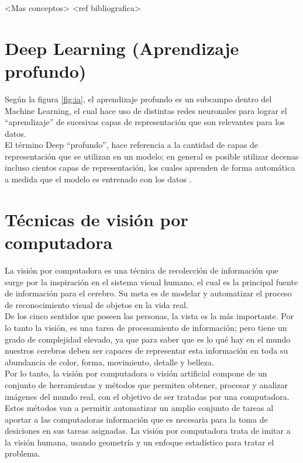 <Mas conceptos> <ref bibliografica>

\section{Deep Learning (Aprendizaje profundo)}
Según la figura \ref{fig:ia}, el aprendizaje profundo es un subcampo dentro del Machine Learning, el cual hace uso de distintas redes neuronales para lograr el ``aprendizaje'' de sucesivas capas de representación que son relevantes para los datos.\\

El término Deep ``profundo'', hace referencia a la cantidad de capas de representación que se utilizan en un modelo; en general es posible utilizar decenas incluso cientos capas de representación, los cuales aprenden de forma automática a medida que el modelo es entrenado con los datos \cite{iaarbook:artificialvision}.

\section{Técnicas de visión por computadora}
La visión por computadora es una técnica de recolección de información que surge por la inspiración en el sistema visual humano, el cual es la principal fuente de información para el cerebro. Su meta es de modelar y automatizar el proceso de reconocimiento visual de objetos en la vida real.\\

De los cinco sentidos que poseen las personas, la vista es la más importante. Por lo tanto la visión, es una tarea de procesamiento de información; pero tiene un grado de complejidad elevado, ya que para saber que es lo qué hay en el mundo nuestros cerebros deben ser capaces de representar esta información en toda su abundancia de color, forma, movimiento, detalle y belleza. \cite{iaarbook:artificialvision}\\

Por lo tanto, la visión por computadora o visión artificial compone de un conjunto de herramientas y métodos que permiten obtener, procesar y analizar imágenes del mundo real, con el objetivo de ser tratadas por una computadora. Estos métodos van a permitir automatizar un amplio conjunto de tareas al aportar a las computadoras información que es necesaria para la toma de desiciones en sus tareas asignadas. La visión por computadora trata de imitar a la visión humana, usando geometría y un enfoque estadístico para tratar el problema.\\

